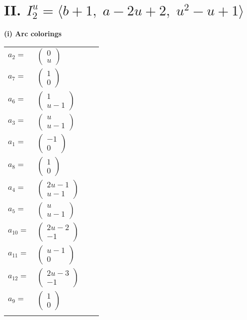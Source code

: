 \documentclass[1p]{elsarticle_modified}
\theoremstyle{definition}
\begin{document}
\centering \section*{II. $I^u_{2}= \langle b+1,\;a-2 u+2,\;u^2- u+1 \rangle$}
\flushleft \textbf{(i) Arc colorings}\\
\begin{tabular}{m{7pt} m{180pt} m{7pt} m{180pt} }
\flushright $a_{2}=$&$\begin{pmatrix}0\\u\end{pmatrix}$ \\
\flushright $a_{7}=$&$\begin{pmatrix}1\\0\end{pmatrix}$ \\
\flushright $a_{6}=$&$\begin{pmatrix}1\\u-1\end{pmatrix}$ \\
\flushright $a_{3}=$&$\begin{pmatrix}u\\u-1\end{pmatrix}$ \\
\flushright $a_{1}=$&$\begin{pmatrix}-1\\0\end{pmatrix}$ \\
\flushright $a_{8}=$&$\begin{pmatrix}1\\0\end{pmatrix}$ \\
\flushright $a_{4}=$&$\begin{pmatrix}2 u-1\\u-1\end{pmatrix}$ \\
\flushright $a_{5}=$&$\begin{pmatrix}u\\u-1\end{pmatrix}$ \\
\flushright $a_{10}=$&$\begin{pmatrix}2 u-2\\-1\end{pmatrix}$ \\
\flushright $a_{11}=$&$\begin{pmatrix}u-1\\0\end{pmatrix}$ \\
\flushright $a_{12}=$&$\begin{pmatrix}2 u-3\\-1\end{pmatrix}$ \\
\flushright $a_{9}=$&$\begin{pmatrix}1\\0\end{pmatrix}$\\&\end{tabular}
\end{document}
